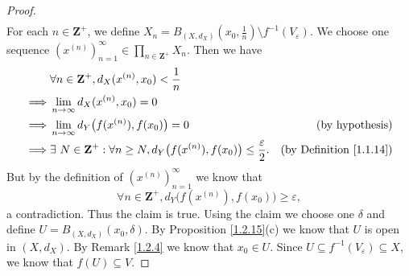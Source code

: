 \begin{proof}
\begin{align*}
    \end{align*}
    For each \(n \in \mathbf{Z}^+\), we define \(X_n = B_{(X, d_X)}(x_0, \frac{1}{n}) \setminus f^{-1}(V_\varepsilon)\).
    We choose one sequence \((x^{(n)})_{n = 1}^\infty \in \prod_{n \in \mathbf{Z}^+} X_n\).
    Then we have
    \begin{align*}
                 & \forall n \in \mathbf{Z}^+, d_X(x^{(n)}, x_0) < \frac{1}{n}                                                                                       \\
        \implies & \lim_{n \to \infty} d_X(x^{(n)}, x_0) = 0                                                                                                         \\
        \implies & \lim_{n \to \infty} d_Y\big(f(x^{(n)}), f(x_0)\big) = 0                                                     & \text{(by hypothesis)}              \\
        \implies & \exists\ N \in \mathbf{Z}^+ : \forall n \geq N, d_Y\big(f(x^{(n)}), f(x_0)\big) \leq \frac{\varepsilon}{2}. & \text{(by Definition \ref{1.1.14})}
    \end{align*}
    But by the definition of \((x^{(n)})_{n = 1}^\infty\) we know that
    \[
        \forall n \in \mathbf{Z}^+, d_Y\big(f(x^{(n)}), f(x_0)\big) \geq \varepsilon,
    \]
    a contradiction.
    Thus the claim is true.
    Using the claim we choose one \(\delta\) and define \(U = B_{(X, d_X)}(x_0, \delta)\).
    By Proposition \ref{1.2.15}(c) we know that \(U\) is open in \((X, d_X)\).
    By Remark \ref{1.2.4} we know that \(x_0 \in U\).
    Since \(U \subseteq f^{-1}(V_\varepsilon) \subseteq X\), we know that \(f(U) \subseteq V\).


\end{proof}
